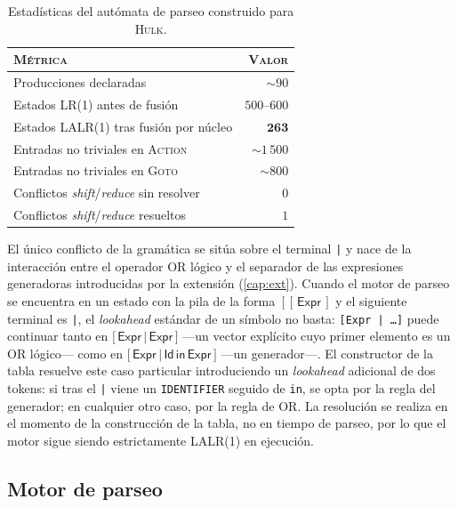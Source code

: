 \documentclass[11pt,a4paper,oneside,openany]{report}
\newcommand{\hulk}{\textsc{Hulk}}
\newcommand{\code}[1]{\texttt{#1}}
\begin{document}
\begin{table}[H]
\centering
\caption{Estadísticas del autómata de parseo construido para \hulk{}.}
\label{tab:lalr-stats}
\begin{tabularx}{0.75\textwidth}{Xr}
\toprule
\textsc{Métrica} & \textsc{Valor} \\
\midrule
Producciones declaradas                 &  $\sim 90$   \\
Estados LR(1) antes de fusión           &  $500$--$600$ \\
Estados LALR(1) tras fusión por núcleo  &  $\mathbf{263}$ \\
Entradas no triviales en \textsc{Action} &  ${\sim}1\,500$ \\
Entradas no triviales en \textsc{Goto}   &  ${\sim}800$  \\
Conflictos \textit{shift}/\textit{reduce} sin resolver &  $0$ \\
Conflictos \textit{shift}/\textit{reduce} resueltos    &  $1$ \\
\bottomrule
\end{tabularx}
\end{table}

El único conflicto de la gramática se sitúa sobre el terminal \code{|} y nace de la
interacción entre el operador OR lógico y el separador de las expresiones
generadoras introducidas por la extensión (\cref{cap:ext}). Cuando el motor de
parseo se encuentra en un estado con la pila de la forma
$[\,\textsf{[}\,\,\textsf{Expr}\,]$ y el siguiente terminal es \code{|}, el
\textit{lookahead} estándar de un símbolo no basta: \code{[Expr | \dots ]} puede
continuar tanto en $\textsf{[}\,\textsf{Expr}\,\textsf{|}\,\textsf{Expr}\,\textsf{]}$
---un vector explícito cuyo primer elemento es un OR lógico--- como en
$\textsf{[}\,\textsf{Expr}\,\textsf{|}\,\textsf{Id}\,\textsf{in}\,\textsf{Expr}\,\textsf{]}$
---un generador---. El constructor de la tabla resuelve este caso particular
introduciendo un \textit{lookahead} adicional de dos tokens: si tras el \code{|}
viene un \code{IDENTIFIER} seguido de \code{in}, se opta por la regla del generador;
en cualquier otro caso, por la regla de OR. La resolución se realiza en el momento
de la construcción de la tabla, no en tiempo de parseo, por lo que el motor sigue
siendo estrictamente LALR(1) en ejecución.

\subsection{Motor de parseo}
\end{document}
